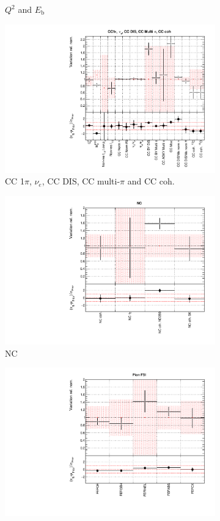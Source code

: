 \begin{figure}[!htbp]
\begin{subfigure}{0.49\textwidth}
  \caption{$Q^2$ and $E_{\mathrm{b}}$}
\end{subfigure}
\begin{subfigure}{0.49\textwidth}
  \centering
  \includegraphics[width=0.9\linewidth]{figs/datxsec3}
  \caption{CC 1$\pi$, $\nu_e$, CC DIS, CC multi-$\pi$ and CC coh.}
\end{subfigure}
\begin{subfigure}{0.45\textwidth}
  \centering
  \includegraphics[width=0.9\linewidth]{figs/datxsec4}
  \caption{NC}
\end{subfigure}
\begin{subfigure}{0.49\textwidth}
  \centering
  \includegraphics[width=0.9\linewidth]{figs/datxsec5}

\end{subfigure}
\end{figure}
